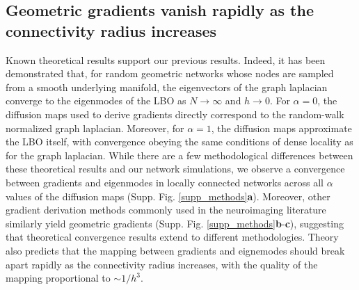 \documentclass{article}
\begin{document}
\subsection*{Geometric gradients vanish rapidly as the connectivity radius increases}

Known theoretical results support our previous results. Indeed, it has been demonstrated that, for random geometric networks whose nodes are sampled from a smooth underlying manifold, the eigenvectors of the graph laplacian converge to the eigenmodes of the LBO as $N\to \infty$ and $h\to 0$\cite{GarcaTrillos2019}. For $\alpha=0$, the diffusion maps used to derive gradients directly correspond to the random-walk normalized graph laplacian. Moreover, for $\alpha = 1$, the diffusion maps approximate the LBO itself, with convergence obeying the same conditions of dense locality as for the graph laplacian\cite{Coifman2006}. While there are a few methodological differences between these theoretical results and our network simulations, we observe a convergence between gradients and eigenmodes in locally connected networks across all $\alpha$ values of the diffusion maps (Supp. Fig. \ref{supp_methods}\textbf{a}). Moreover, other gradient derivation methods commonly used in the neuroimaging literature similarly yield geometric gradients (Supp. Fig. \ref{supp_methods}\textbf{b}-\textbf{c}), suggesting that theoretical convergence results extend to different methodologies. Theory also predicts that the mapping between gradients and eignemodes should break apart rapidly as the connectivity radius increases, with the quality of the mapping proportional to $\sim 1/h^3$.
\end{document}
